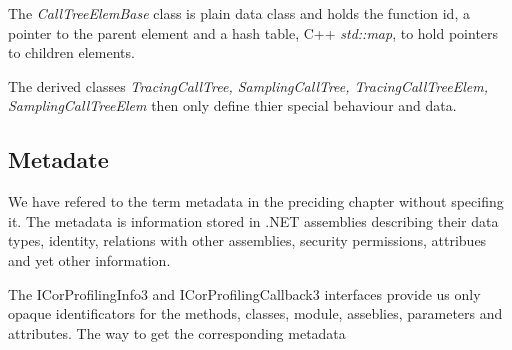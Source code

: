 The \textit{CallTreeElemBase} class is plain data class and holds the function id, a pointer to the parent element and a hash table, C++ \textit{std::map}, to hold pointers to children elements.

The derived classes \textit{TracingCallTree, SamplingCallTree, TracingCallTreeElem, SamplingCallTreeElem} then only define thier special behaviour and data. 

\subsection{Metadate}
We have refered to the term metadata in the preciding chapter without specifing it. The metadata is information stored in .NET assemblies describing their data types, identity, relations with other assemblies, security permissions, attribues and yet other information.

The ICorProfilingInfo3 and ICorProfilingCallback3 interfaces provide us only opaque identificators for the methods, classes, module, asseblies, parameters and attributes. The way to get the corresponding metadata
